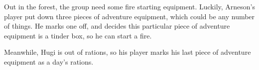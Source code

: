 \begin{exampletext}
  Out in the forest, the group need some fire starting equipment.
  Luckily, Arneson's player put down three pieces of \gls{adventure} equipment, which could be any number of things.
  He marks one off, and decides this particular piece of \gls{adventure} equipment is a tinder box, so he can start a fire.

  Meanwhile, Hugi is out of rations, so his player marks his last piece of \gls{adventure} equipment as a day's rations.

\end{exampletext}
